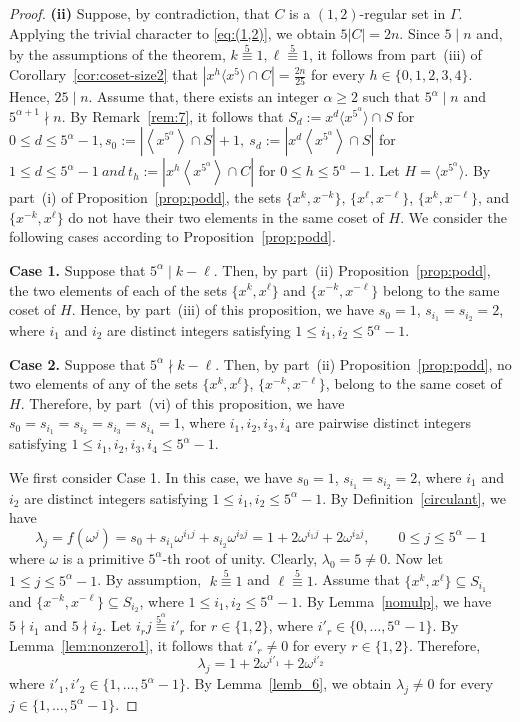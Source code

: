 \documentclass[12pt]{article}
\begin{document}
\begin{proof}
\textbf{(ii)} Suppose, by contradiction, that \(C\) is a \((1,2)\)-regular set in \(\Gamma\). Applying the trivial character to \eqref{eq:(1,2)}, we obtain \(5|C|=2n\). Since \(5\mid n\) and, by the assumptions of the theorem, $
k\stackrel{5}{\equiv}1, \ell\stackrel{5}{\equiv}1$, it follows from part~(iii) of Corollary~\ref{cor:coset-size2} that \(\left|x^{h}\langle x^{5}\rangle\cap C\right|=\frac{2n}{25}\) for every \(h\in\{0,1,2,3,4\}\). Hence, \(25\mid n\). Assume that, there exists an integer \(\alpha\ge 2\) such that
$
5^{\alpha}\mid n$
and
$5^{\alpha+1}\nmid n.$ By Remark~\ref{rem:7}, it follows that $ S_d := x^d \langle x^{5^{\alpha}} \rangle \cap S$ for $0 \le d \le 5^{\alpha}-1, s_0:=\left|\left\langle x^{5^{\alpha}}\right\rangle\cap S\right|+1,\ 	s_d:=\left|x^d\left\langle x^{5^{\alpha}}\right\rangle\cap S\right|$ for $1\le d\le 5^{\alpha}-1\ and\ t_h:=\left|x^h\left\langle x^{5^{\alpha}}\right\rangle\cap C\right|$ for $0\le h\le 5^{\alpha}-1.$ Let
$
H=\langle x^{5^{\alpha}}\rangle.
$ By part~(i) of Proposition~\ref{prop:podd}, the sets $\{x^k,x^{-k}\}$, $\{x^\ell,x^{-\ell}\}$, $\{x^k,x^{-\ell}\}$, and $\{x^{-k},x^{\ell}\}$ do not have their two elements in the same coset of $H$. We consider the following cases according to Proposition~\ref{prop:podd}.

 \textbf{Case 1.}  Suppose that $5^\alpha\mid k-\ell$. Then, by part~(ii) Proposition~\ref{prop:podd}, the two elements of each of the sets $\{x^k,x^\ell\}$ and $\{x^{-k},x^{-\ell}\}$ belong to the same coset of $H$. Hence, by part~(iii) of this proposition, we have $s_0=1$, $s_{i_1}=s_{i_2}=2$, where $i_1$ and $i_2$ are distinct integers satisfying $1\le i_1,i_2\le 5^\alpha-1$.

\textbf{Case 2.} Suppose that $5^\alpha\nmid k-\ell$. Then, by part~(ii) Proposition~\ref{prop:podd}, no two elements of any of the sets $\{x^k,x^\ell\}$, $\{x^{-k},x^{-\ell}\}$, belong to the same coset of $H$. Therefore, by part~(vi) of this proposition, we have $s_0= s_{i_1}=s_{i_2}=s_{i_3}=s_{i_4}=1$, where $i_1,i_2,i_3,i_4$ are pairwise distinct integers satisfying $1\le i_1,i_2,i_3,i_4\le 5^\alpha-1$.

We first consider Case 1. In this case, we have $s_0=1$, $s_{i_1}=s_{i_2}=2$, where $i_1$ and $i_2$ are distinct integers satisfying $1\le i_1,i_2\le 5^\alpha-1$. By Definition~\ref{circulant}, we have
\[
\lambda_j=f(\omega^j)
=s_0+s_{i_1}\omega^{i_1j}+s_{i_2}\omega^{i_2j}
=1+2\omega^{i_1j}+2\omega^{i_2j},
\qquad
0\le j\le 5^{\alpha}-1
\]
where $\omega$ is a primitive $5^{\alpha}$-th root of unity. Clearly, $\lambda_0=5\neq0.$ Now let \(1\le j\le 5^\alpha-1\).
By assumption, $\; k\stackrel{5}{\equiv}1$ and $\ell\stackrel{5}{\equiv}1$. Assume that $\{x^k,x^\ell\}\subseteq S_{i_1}$ and $\{x^{-k},x^{-\ell}\}\subseteq S_{i_2}$, where $1\leq i_1,i_2\leq 5^\alpha-1$. By Lemma~\ref{nomulp}, we have $5\nmid i_1$ and $5\nmid i_2$. Let $i_rj\stackrel{5^\alpha}{\equiv} i'_r$ for $r\in\{1,2\}$, where $i'_r\in\{0,\ldots,5^\alpha-1\}$. By Lemma~\ref{lem:nonzero1}, it follows that $i'_{r}\neq0$ for every $r\in\{1,2\}$. Therefore,
\[
\lambda_j=1+2\omega^{i'_1}+2\omega^{i'_2}
\]
where $i'_1,i'_2\in\{1,\ldots,5^\alpha-1\}$. By Lemma~\ref{lemb_6}, we obtain $\lambda_j\neq0$ for every $j\in\{1,\ldots,5^\alpha-1\}$.


\end{proof}
\end{document}
